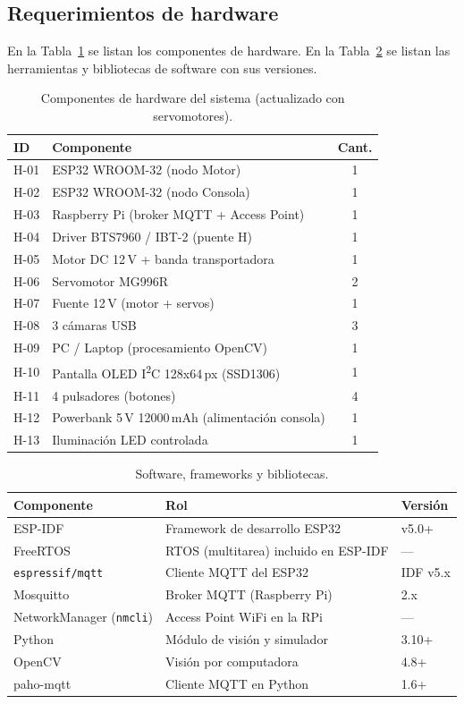 \documentclass[12pt]{catolica_proyectos}
\begin{document}
\subsection{Requerimientos de hardware}
En la Tabla~\ref{tab:hw} se listan los componentes de hardware. En la Tabla~\ref{tab:sw} se listan las herramientas y bibliotecas de software con sus versiones.

\begin{table}[H]
\centering
\caption{Componentes de hardware del sistema (actualizado con servomotores).}
\label{tab:hw}
\footnotesize
\begin{tabular}{@{}llc@{}}
\toprule
\textbf{ID} & \textbf{Componente} & \textbf{Cant.} \\
\midrule
H-01 & ESP32 WROOM-32 (nodo Motor) & 1 \\
H-02 & ESP32 WROOM-32 (nodo Consola) & 1 \\
H-03 & Raspberry Pi (broker MQTT + Access Point) & 1 \\
H-04 & Driver BTS7960 / IBT-2 (puente H) & 1 \\
H-05 & Motor DC 12\,V + banda transportadora & 1 \\
H-06 & Servomotor MG996R & 2 \\
H-07 & Fuente 12\,V (motor + servos) & 1 \\
H-08 & 3 cámaras USB & 3 \\
H-09 & PC / Laptop (procesamiento OpenCV) & 1 \\
H-10 & Pantalla OLED I\textsuperscript{2}C 128x64\,px (SSD1306) & 1 \\
H-11 & 4 pulsadores (botones) & 4 \\
H-12 & Powerbank 5\,V 12000\,mAh (alimentación consola) & 1 \\
H-13 & Iluminación LED controlada & 1 \\
\bottomrule
\end{tabular}
\end{table}

\begin{table}[H]
\centering
\caption{Software, frameworks y bibliotecas.}
\label{tab:sw}
\footnotesize
\begin{tabular}{@{}lll@{}}
\toprule
\textbf{Componente} & \textbf{Rol} & \textbf{Versión} \\
\midrule
ESP-IDF & Framework de desarrollo ESP32 & v5.0+ \\
FreeRTOS & RTOS (multitarea) incluido en ESP-IDF & --- \\
\texttt{espressif/mqtt} & Cliente MQTT del ESP32 & IDF v5.x \\
Mosquitto & Broker MQTT (Raspberry Pi) & 2.x \\
NetworkManager (\texttt{nmcli}) & Access Point WiFi en la RPi & --- \\
Python & Módulo de visión y simulador & 3.10+ \\
OpenCV & Visión por computadora & 4.8+ \\
paho-mqtt & Cliente MQTT en Python & 1.6+ \\
\bottomrule
\end{tabular}
\end{table}
\end{document}
